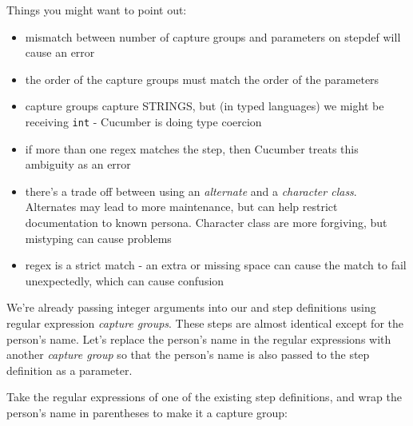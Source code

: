     Things you might want to point out:
     \begin{itemize}
        \item mismatch between number of capture groups and parameters on stepdef will cause an error
        \item the order of the capture groups must match the order of the parameters
        \item capture groups capture STRINGS, but (in typed languages) we might be receiving \texttt{int} - Cucumber is doing type coercion
        \item if more than one regex matches the step, then Cucumber treats this ambiguity as an error
        \item there's a trade off between using an \emph{alternate} and a \emph{character class}. Alternates may lead to more maintenance, but can help restrict documentation to known persona. Character class are more forgiving, but mistyping can cause problems
        \item regex is a strict match - an extra or missing space can cause the match to fail unexpectedly, which can cause confusion
     \end{itemize}
     
\fi 

\ifcontent 
    We're already passing integer arguments into our  and  step definitions using regular expression \emph{capture groups}. These steps are almost identical except for the person's name. Let's replace the person's name in the regular expressions with another \emph{capture group} so that the person's name is also passed to the step definition as a parameter.
    
    Take the regular expressions of one of the existing step definitions, and wrap the person's name in parentheses to make it a capture group:
    
    
